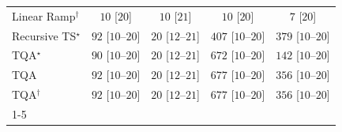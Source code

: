 \begin{tabular}{l|cccc|}
Linear Ramp$^\dagger$ & {\cellcolor[HTML]{F7FCF5}} \color[HTML]{000000} $10$ [$20$] & {\cellcolor[HTML]{F7FCF5}} \color[HTML]{000000} $10$ [$21$] & {\cellcolor[HTML]{F7FCF5}} \color[HTML]{000000} $10$ [$20$] & {\cellcolor[HTML]{F7FCF5}} \color[HTML]{000000} $7$ [$20$] \\
Recursive TS$^\star$ & {\cellcolor[HTML]{E7F6E3}} \color[HTML]{000000} $92$ [$10$--$20$] & {\cellcolor[HTML]{F5FBF2}} \color[HTML]{000000} $20$ [$12$--$21$] & {\cellcolor[HTML]{6DC072}} \color[HTML]{000000} $407$ [$10$--$20$] & {\cellcolor[HTML]{7AC77B}} \color[HTML]{000000} $379$ [$10$--$20$] \\
TQA$^\star$ & {\cellcolor[HTML]{E8F6E3}} \color[HTML]{000000} $90$ [$10$--$20$] & {\cellcolor[HTML]{F5FBF2}} \color[HTML]{000000} $20$ [$12$--$21$] & {\cellcolor[HTML]{03702E}} \color[HTML]{F1F1F1} $672$ [$10$--$20$] & {\cellcolor[HTML]{DAF0D4}} \color[HTML]{000000} $142$ [$10$--$20$] \\
TQA & {\cellcolor[HTML]{E7F6E3}} \color[HTML]{000000} $92$ [$10$--$20$] & {\cellcolor[HTML]{F5FBF2}} \color[HTML]{000000} $20$ [$12$--$21$] & {\cellcolor[HTML]{016E2D}} \color[HTML]{F1F1F1} $677$ [$10$--$20$] & {\cellcolor[HTML]{86CC85}} \color[HTML]{000000} $356$ [$10$--$20$] \\
TQA$^\dagger$ & {\cellcolor[HTML]{E7F6E3}} \color[HTML]{000000} $92$ [$10$--$20$] & {\cellcolor[HTML]{F5FBF2}} \color[HTML]{000000} $20$ [$12$--$21$] & {\cellcolor[HTML]{016E2D}} \color[HTML]{F1F1F1} $677$ [$10$--$20$] & {\cellcolor[HTML]{86CC85}} \color[HTML]{000000} $356$ [$10$--$20$] \\
\cline{1-5}
\bottomrule
\end{tabular}
